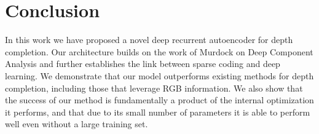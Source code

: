 
\section{Conclusion}
\label{sec:conclusion}

In this work we have proposed a novel deep recurrent autoencoder for depth completion. Our architecture builds on the work of Murdock \etal on Deep Component Analysis and further establishes the link between sparse coding and deep learning. We demonstrate that our model outperforms existing methods for depth completion, including those that leverage RGB information. We also show that the success of our method is fundamentally a product of the internal optimization it performs, and that due to its small number of parameters it is able to perform well even without a large training set.